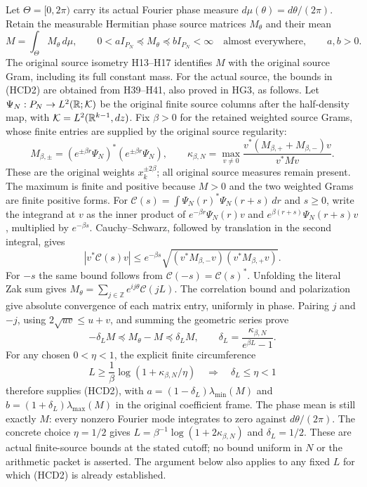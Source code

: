 Let $\Theta=[0,2\pi)$ carry its actual Fourier phase measure
$d\mu(\theta)=d\theta/(2\pi)$. Retain the measurable Hermitian
phase source matrices $M_\theta$ and their mean
\[
 M=\int_\Theta M_\theta\,d\mu,\qquad
 0<a I_{P_N}\preceq M_\theta\preceq b I_{P_N}<\infty
 \quad\text{almost everywhere},\qquad a,b>0.
 \tag{HCD2}
\]
The original source isometry H13--H17 identifies $M$ with the
original source Gram, including its full constant mass.
For the actual source, the bounds in (HCD2) are obtained from
H39--H41, also proved in HG3, as follows. Let
$\Psi_N:P_N\to L^2(\mathbb{R};\mathcal K)$ be the original finite
source columns after the half-density map, with
$\mathcal K=L^2(\mathbb{R}^{k-1},dz)$. Fix $\beta>0$ for the retained
weighted source Grams, whose finite entries are supplied by
the original source regularity:
\[
 M_{\beta,\pm}=(e^{\pm\beta r}\Psi_N)^*
                    (e^{\pm\beta r}\Psi_N),\qquad
 \kappa_{\beta,N}=
 \max_{v\ne0}\frac{v^*(M_{\beta,+}+M_{\beta,-})v}{v^*Mv}.
 \tag{HCD2a}
\]
These are the original weights $x_k^{\pm2\beta}$; all original
source measures remain present. The maximum is finite and positive
because $M>0$ and the two weighted Grams are finite positive forms.
For $\mathcal C(s)=\int\Psi_N(r)^*\Psi_N(r+s)\,dr$ and $s\ge0$,
write the integrand at $v$ as the inner product of
$e^{-\beta r}\Psi_N(r)v$ and
$e^{\beta(r+s)}\Psi_N(r+s)v$, multiplied by $e^{-\beta s}$.
Cauchy--Schwarz, followed by translation in the second integral,
gives
\[
 |v^*\mathcal C(s)v|
 \le e^{-\beta s}
 \sqrt{(v^*M_{\beta,-}v)(v^*M_{\beta,+}v)} .
\]
For $-s$ the same bound follows from
$\mathcal C(-s)=\mathcal C(s)^*$.
Unfolding the literal Zak sum gives
$M_\theta=\sum_{j\in\mathbb Z}e^{ij\theta}\mathcal C(jL)$.
The correlation bound and polarization give absolute convergence
of each matrix entry, uniformly in phase. Pairing $j$ and $-j$,
using $2\sqrt{uv}\le u+v$, and summing the geometric series prove
\[
 -\delta_LM\preceq M_\theta-M\preceq\delta_LM,\qquad
 \delta_L=\frac{\kappa_{\beta,N}}{e^{\beta L}-1}.
 \tag{HCD2b}
\]
For any chosen $0<\eta<1$, the explicit finite circumference
\[
 L\ge\frac1\beta\log(1+\kappa_{\beta,N}/\eta)
 \quad\Longrightarrow\quad
 \delta_L\le\eta<1
 \tag{HCD2c}
\]
therefore supplies (HCD2), with
$a=(1-\delta_L)\lambda_{\min}(M)$ and
$b=(1+\delta_L)\lambda_{\max}(M)$ in the original coefficient
frame. The phase mean is still exactly $M$: every nonzero
Fourier mode integrates to zero against $d\theta/(2\pi)$.
The concrete choice $\eta=1/2$ gives
$L=\beta^{-1}\log(1+2\kappa_{\beta,N})$ and $\delta_L=1/2$.
These are actual finite-source bounds at the stated cutoff;
no bound uniform in $N$ or the arithmetic packet is asserted.
The argument below also applies to any fixed $L$ for which
(HCD2) is already established.

